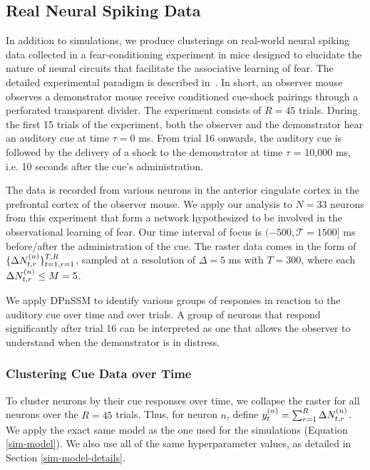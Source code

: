 \documentclass[twoside]{article}
\begin{document}
\subsection{Real Neural Spiking Data}
In addition to simulations, we produce clusterings on real-world neural spiking data collected in a fear-conditioning experiment in mice designed to elucidate the nature of neural circuits that facilitate the associative learning of fear. The detailed experimental paradigm is described in~\cite{allsop2018corticoamygdala}.  In short, an observer mouse observes a demonstrator mouse receive conditioned cue-shock pairings through a perforated transparent divider. The experiment consists of $R = 45$ trials. During the first 15 trials of the experiment, both the observer and the demonstrator hear an auditory cue at time $\tau = 0$ ms. From trial 16 onwards, the auditory cue is followed by the delivery of a shock to the demonstrator at time $\tau$ = 10,000 ms, i.e. 10 seconds after the cue's administration. 

The data is recorded from various neurons in the anterior cingulate cortex in the prefrontal cortex of the observer mouse.  We apply our analysis to $N = 33$ neurons from this experiment that form a network hypothesized to be involved in the observational learning of fear.  Our time interval of focus is $(-500, \mathcal{T} = 1500]$ ms before/after the administration of the cue.  The raster data comes in the form of $\{\Delta \idx[t, r] N n\}_{t=1, r=1}^{T, R}$, sampled at a resolution of $\Delta = 5$ ms with $T = 300$, where each $\Delta \idx[t, r] N n \leq M = 5$.  

We apply DPnSSM to identify various groups of responses in reaction to the auditory cue over time and over trials.  A group of neurons that respond significantly after trial 16 can be interpreted as one that allows the observer to understand when the demonstrator is in distress.

\subsubsection{Clustering Cue Data over Time} \label{sssec:time-data}
To cluster neurons by their cue responses over time, we collapse the raster for all neurons over the $R = 45$ trials.  Thus, for neuron $n$, define $\idx[t] y n = \sum_{r=1}^R \Delta \idx[t, r] N n$.  We apply the exact same model as the one used for the simulations (Equation \ref{sim-model}).  We also use all of the same hyperparameter values, as detailed in Section \ref{sim-model-details}.
\end{document}
